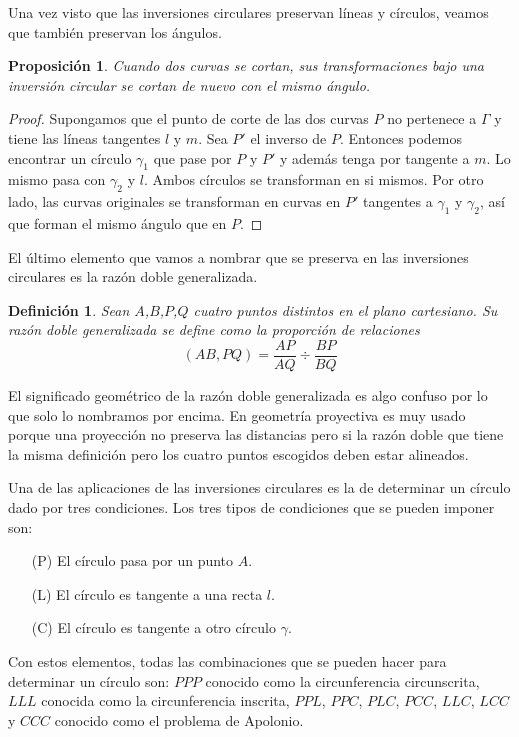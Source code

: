 \documentclass[a4paper]{amsart}
\theoremstyle{plain}
\newtheorem{definition}{Definición}
\newtheorem{proposition}{Proposición}
\begin{document}
Una vez visto que las inversiones circulares preservan líneas y círculos, veamos que también preservan los ángulos.

\begin{proposition}
Cuando dos curvas se cortan, sus transformaciones bajo una inversión circular se cortan de nuevo con el mismo ángulo.
\end{proposition}

\begin{proof}
Supongamos que el punto de corte de las dos curvas $P$ no pertenece a $\Gamma$ y tiene las líneas tangentes $l$ y $m$. Sea $P'$ el inverso de $P$. Entonces podemos encontrar un círculo $\gamma_1$ que pase por $P$ y $P'$ y además tenga por tangente a $m$. Lo mismo pasa con $\gamma_2$ y $l$. Ambos círculos se transforman en si mismos. Por otro lado, las curvas originales se transforman en curvas en $P'$ tangentes a $\gamma_1$ y $\gamma_2$, así que forman el mismo ángulo que en $P$. 
\end{proof}

El último elemento que vamos a nombrar que se preserva en las inversiones circulares es la razón doble generalizada.

\begin{definition}
Sean $A$,$B$,$P$,$Q$ cuatro puntos distintos en el plano cartesiano. Su razón doble generalizada se define como la proporción de relaciones
\[
(AB,PQ)=\frac{AP}{AQ}\div \frac{BP}{BQ}
\]
\end{definition}

El significado geométrico de la razón doble generalizada es algo confuso por lo que solo lo nombramos por encima. En geometría proyectiva es muy usado porque una proyección no preserva las distancias pero si la razón doble que tiene la misma definición pero los cuatro puntos escogidos deben estar alineados.

Una de las aplicaciones de las inversiones circulares es la de determinar un círculo dado por tres condiciones. Los tres tipos de condiciones que se pueden imponer son:
\begin{enumerate}
\item [(P)] El círculo pasa por un punto $A$.
\item [(L)] El círculo es tangente a una recta $l$.
\item [(C)] El círculo es tangente a otro círculo $\gamma$.
\end{enumerate}
Con estos elementos, todas las combinaciones que se pueden hacer para determinar un círculo son:
$PPP$ conocido como la circunferencia circunscrita, $LLL$ conocida como la circunferencia inscrita, $PPL$, $PPC$, $PLC$, $PCC$, $LLC$, $LCC$ y $CCC$ conocido como el problema de Apolonio.
\end{document}
